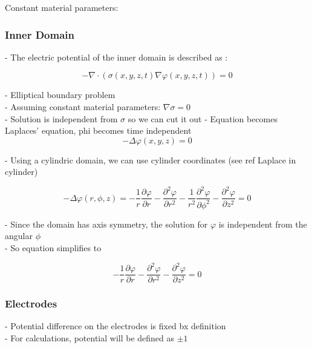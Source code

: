\documentclass[parskip=half, titlepage=yes, 12pt, BCOR=12mm, DIV=calc]{scrartcl}
\begin{document}
Constant material parameters: \\

\subsubsection{Inner Domain}

- The electric potential of the inner domain is described as : 

\begin{equation}
    - \nabla \cdot (\sigma(x,y,z,t) \nabla \varphi(x,y,z,t)) = 0
\end{equation}

- Elliptical boundary problem \\
- Assuming constant material parameters: $\nabla \sigma = 0$ \\
- Solution is independent from $\sigma$ so we can cut it out
- Equation becomes Laplaces' equation, phi becomes time independent \\

\begin{equation}
    - \Delta \varphi(x,y,z) = 0
\end{equation}

- Using a cylindric domain, we can use cylinder coordinates (see ref Laplace in cylinder)

\begin{equation}
    - \Delta \varphi(r,\phi,z) = - \frac{1}{r} \frac{\partial \varphi}{\partial r} - \frac{\partial^2 \varphi}{\partial r^2} - \frac{1}{r^2} \frac{\partial^2 \varphi}{\partial \phi^2} -      \frac{\partial^2 \varphi}{\partial z^2}  = 0
\end{equation}

- Since the domain has axis symmetry, the solution for $\varphi$ is independent from the angular $\phi$ \\
- So equation simplifies to 

\begin{equation}
    - \frac{1}{r} \frac{\partial \varphi}{\partial r} - \frac{\partial^2 \varphi}{\partial r^2} - \frac{\partial^2 \varphi}{\partial z^2} = 0
\end{equation}


\subsubsection{Electrodes}

- Potential difference on the electrodes is fixed bx definition \\
- For calculations, potential will be defined as $\pm 1$ \\
\end{document}
